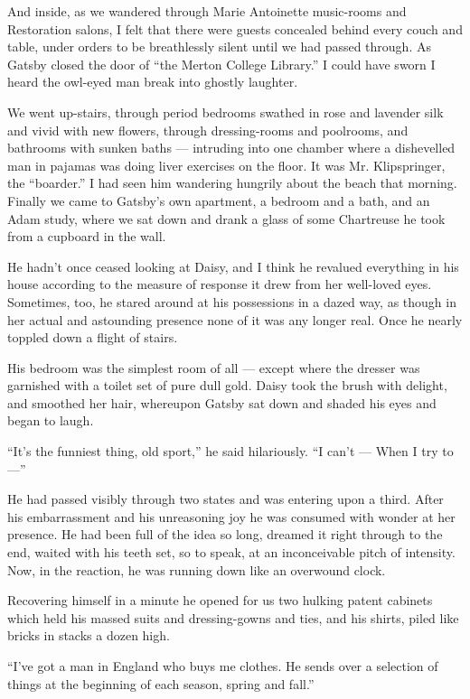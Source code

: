 \documentclass{znotebook}
\begin{document}
And inside, as we wandered through Marie Antoinette music-rooms and Restoration salons, I felt that there were guests concealed behind every couch and table, under orders to be breathlessly silent until we had passed through. As Gatsby closed the door of ``the Merton College Library.'' I could have sworn I heard the owl-eyed man break into ghostly laughter.

We went up-stairs, through period bedrooms swathed in rose and lavender silk and vivid with new flowers, through dressing-rooms and poolrooms, and bathrooms with sunken baths ---{} intruding into one chamber where a dishevelled man in pajamas was doing liver exercises on the floor. It was Mr. Klipspringer, the ``boarder.'' I had seen him wandering hungrily about the beach that morning. Finally we came to Gatsby's own apartment, a bedroom and a bath, and an Adam study, where we sat down and drank a glass of some Chartreuse he took from a cupboard in the wall.

He hadn't once ceased looking at Daisy, and I think he revalued everything in his house according to the measure of response it drew from her well-loved eyes. Sometimes, too, he stared around at his possessions in a dazed way, as though in her actual and astounding presence none of it was any longer real. Once he nearly toppled down a flight of stairs.

His bedroom was the simplest room of all ---{} except where the dresser was garnished with a toilet set of pure dull gold. Daisy took the brush with delight, and smoothed her hair, whereupon Gatsby sat down and shaded his eyes and began to laugh.

``It's the funniest thing, old sport,'' he said hilariously. ``I can't ---{} When I try to ---''

He had passed visibly through two states and was entering upon a third. After his embarrassment and his unreasoning joy he was consumed with wonder at her presence. He had been full of the idea so long, dreamed it right through to the end, waited with his teeth set, so to speak, at an inconceivable pitch of intensity. Now, in the reaction, he was running down like an overwound clock.

Recovering himself in a minute he opened for us two hulking patent cabinets which held his massed suits and dressing-gowns and ties, and his shirts, piled like bricks in stacks a dozen high.

``I've got a man in England who buys me clothes. He sends over a selection of things at the beginning of each season, spring and fall.''
\end{document}
